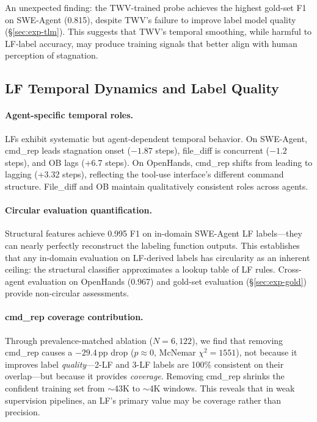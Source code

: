 \documentclass[11pt,a4paper]{article}
\begin{document}
An unexpected finding: the TWV-trained probe achieves the highest gold-set F1 on SWE-Agent (0.815), despite TWV's failure to improve label model quality (\S\ref{sec:exp-tlm}).
This suggests that TWV's temporal smoothing, while harmful to LF-label accuracy, may produce training signals that better align with human perception of stagnation.

\subsection{LF Temporal Dynamics and Label Quality}
\label{sec:exp-lf}

\paragraph{Agent-specific temporal roles.}
LFs exhibit systematic but agent-dependent temporal behavior.
On SWE-Agent, cmd\_rep leads stagnation onset ($-1.87$ steps), file\_diff is concurrent ($-1.2$ steps), and OB lags (+6.7 steps).
On OpenHands, cmd\_rep shifts from leading to lagging (+3.32 steps), reflecting the tool-use interface's different command structure.
File\_diff and OB maintain qualitatively consistent roles across agents.

\paragraph{Circular evaluation quantification.}
Structural features achieve 0.995 F1 on in-domain SWE-Agent LF labels---they can nearly perfectly reconstruct the labeling function outputs.
This establishes that any in-domain evaluation on LF-derived labels has circularity as an inherent ceiling: the structural classifier approximates a lookup table of LF rules.
Cross-agent evaluation on OpenHands (0.967) and gold-set evaluation (\S\ref{sec:exp-gold}) provide non-circular assessments.

\paragraph{cmd\_rep coverage contribution.}
Through prevalence-matched ablation ($N{=}6{,}122$), we find that removing cmd\_rep causes a $-29.4$\,pp drop ($p \approx 0$, McNemar $\chi^2 = 1551$), not because it improves label \emph{quality}---2-LF and 3-LF labels are 100\% consistent on their overlap---but because it provides \emph{coverage}.
Removing cmd\_rep shrinks the confident training set from $\sim$43K to $\sim$4K windows.
This reveals that in weak supervision pipelines, an LF's primary value may be coverage rather than precision.
\end{document}
